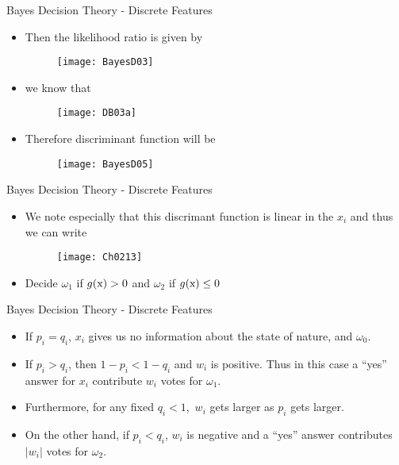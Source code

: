\begin{frame}{Bayes Decision Theory - Discrete Features}
\begin{itemize}
\item Then the likelihood ratio is given by
\begin{figure}
\texttt{[image: BayesD03]}
\end{figure}
\item we know that
\begin{figure}
\texttt{[image: DB03a]}
\end{figure}
\item Therefore discriminant function will be
\begin{figure}
\texttt{[image: BayesD05]}
\end{figure}
\end{itemize}
\end{frame}


\begin{frame}{Bayes Decision Theory - Discrete Features}
\begin{itemize}
\item We note especially that this discrimant function is linear in the $x_i$ and thus we can write
\begin{figure}
\texttt{[image: Ch0213]}
\end{figure}
\item Decide $\omega_1$ if $g({\rm x})>0$ and $\omega_2$ if $g({\rm x})\leq 0$
\end{itemize}
\end{frame}

\begin{frame}{Bayes Decision Theory - Discrete Features}
\begin{itemize}
\item If $p_i=q_i$, $x_i$ gives us no information about the state of nature, and $\omega_0$.
\item If $p_i>q_i$, then $1-p_i<1-q_i$ and $w_i$ is positive. Thus in this case a ``yes'' answer for $x_i$ contribute $w_i$ votes for $\omega_1$.
\item Furthermore, for any fixed $q_i<1$,~$w_i$ gets larger as $p_i$ gets larger.
\item On the other hand, if $p_i<q_i$, $w_i$ is negative and a ``yes'' answer contributes $|w_i|$ votes for $\omega_2$.
\end{itemize}
\end{frame}

